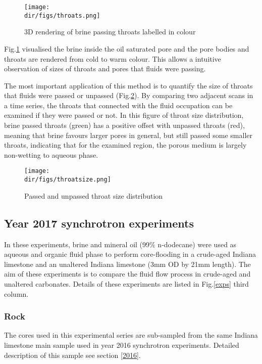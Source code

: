 \begin{figure}[htbp]
  \centering
  \texttt{[image: \\dir/figs/throats.png]}
  \caption{3D rendering of brine passing throats labelled in colour}
  \label{throats}
\end{figure}

Fig.\ref{throats} visualised the brine inside the oil saturated pore and the pore bodies and throats are rendered from cold to warm colour. This allows a intuitive observation of sizes of throats and pores that fluids were passing.

The most important application of this method is to quantify the size of throats that fluids were passed or unpassed (Fig.\ref{throatsize}). By comparing two adjacent scans in a time series, the throats that connected with the fluid occupation can be examined if they were passed or not. In this figure of throat size distribution, brine passed throats (green) has a positive offset with unpassed throats (red), meaning that brine favours larger pores in general, but still passed some smaller throats, indicating that for the examined region, the porous medium is largely non-wetting to aqueous phase.

\begin{figure}[htbp]
  \centering
  \texttt{[image: \\dir/figs/throatsize.png]}
  \caption{Passed and unpassed throat size distribution}
  \label{throatsize}
\end{figure}



\subsection{Year 2017 synchrotron experiments}

In these experiments, brine and mineral oil (99\% n-dodecane) were used as aqueous and organic fluid phase to perform core-flooding in a crude-aged Indiana limestone and an unaltered Indiana limestone (3mm OD by 21mm length). The aim of these experiments is to compare the fluid flow process in crude-aged and unaltered carbonates. Details of these experiments are listed in Fig.\ref{exps} third column.

\subsubsection{Rock}
The cores used in this experimental series are sub-sampled from the same Indiana limestone main sample used in year 2016 synchrotron experiments. Detailed description of this sample see section \ref{2016}.

